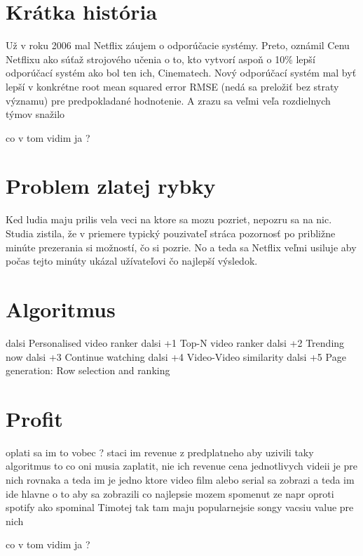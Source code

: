 \documentclass[10pt,twoside,slovak,a4paper]{article}
\begin{document}
\section{Krátka história} \label{Netflix prize} %
Už v roku 2006 mal Netflix záujem o odporúčacie systémy.\cite{amatriain2015recommender} Preto, oznámil Cenu Netflixu ako súťaž strojového učenia o to, kto vytvorí aspoň o 10\% lepší odporúčací systém ako bol ten ich, Cinematech. Nový odporúčací systém mal byť lepší v konkrétne root mean squared error RMSE (nedá sa preložiť bez straty významu) pre predpokladané hodnotenie. A zrazu sa veľmi veľa rozdielnych týmov snažilo

co v tom vidim ja ?

\section{Problem zlatej rybky} %
Ked ludia maju prilis vela veci na ktore sa mozu pozriet, nepozru sa na nic. Studia \cite{10.1145/2843948} zistila, že v priemere typický pouzivateľ stráca pozornosť po približne minúte prezerania si možností, čo si pozrie. No a teda sa Netflix veľmi usiluje aby počas tejto minúty ukázal užívateľovi čo najlepší výsledok.

\section{Algoritmus}
dalsi Personalised video ranker
dalsi +1 Top-N video ranker
dalsi +2 Trending now
dalsi +3 Continue watching
dalsi +4 Video-Video similarity %
dalsi +5 Page generation: Row selection and ranking

\section{Profit}
oplati sa im to vobec ? staci im revenue z predplatneho aby uzivili taky algoritmus
to co oni musia zaplatit, nie ich revenue cena jednotlivych videii je pre nich rovnaka a teda im je jedno ktore video film alebo serial sa zobrazi a teda im ide hlavne o to aby sa zobrazili co najlepsie \cite{amatriain2015recommender}
mozem spomenut ze napr oproti spotify ako spominal Timotej tak tam maju popularnejsie songy vacsiu value pre nich

co v tom vidim ja ?
\end{document}
